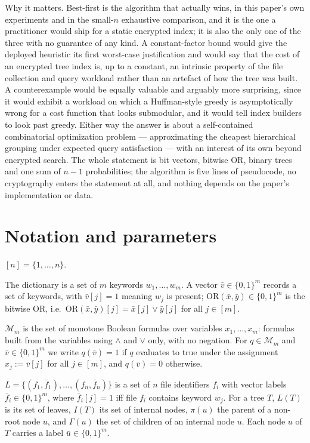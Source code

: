 \documentclass{aicr-conjecture}
\newcommand{\bits}{\{0,1\}}
\newcommand{\Mon}{\mathcal{M}}
\newcommand{\ORv}{\mathrm{OR}}
\begin{document}
Why it matters. Best-first is the algorithm that actually wins, in this
paper's own experiments and in the small-$n$ exhaustive comparison, and
it is the one a practitioner would ship for a static encrypted index; it
is also the only one of the three with no guarantee of any kind. A
constant-factor bound would give the deployed heuristic its first
worst-case justification and would say that the cost of an encrypted tree
index is, up to a constant, an intrinsic property of the file collection
and query workload rather than an artefact of how the tree was built. A
counterexample would be equally valuable and arguably more surprising,
since it would exhibit a workload on which a Huffman-style greedy is
asymptotically wrong for a cost function that looks submodular, and it
would tell index builders to look past greedy. Either way the answer is
about a self-contained combinatorial optimization problem ---
approximating the cheapest hierarchical grouping under expected query
satisfaction --- with an interest of its own beyond encrypted search. The
whole statement is bit vectors, bitwise OR, binary trees and one sum of
$n-1$ probabilities; the algorithm is five lines of pseudocode, no
cryptography enters the statement at all, and nothing depends on the
paper's implementation or data.

\section{Notation and parameters}\label{sec:notation}

$[n] = \{1,\dots,n\}$.

The dictionary is a set of $m$ keywords $w_1,\dots,w_m$. A vector
$\bar v \in \bits^m$ records a set of keywords, with $\bar v[j] = 1$
meaning $w_j$ is present; $\ORv(\bar x,\bar y) \in \bits^m$ is the
bitwise OR, i.e.\ $\ORv(\bar x,\bar y)[j] = \bar x[j] \vee \bar y[j]$ for
all $j \in [m]$.

$\Mon_m$ is the set of monotone Boolean formulas over variables
$x_1,\dots,x_m$: formulas built from the variables using $\wedge$ and
$\vee$ only, with no negation. For $q \in \Mon_m$ and
$\bar v \in \bits^m$ we write $q(\bar v) = 1$ if $q$ evaluates to true
under the assignment $x_j := \bar v[j]$ for all $j \in [m]$, and
$q(\bar v) = 0$ otherwise.

$L = \{(f_1,\bar f_1),\dots,(f_n,\bar f_n)\}$ is a set of $n$ file
identifiers $f_i$ with vector labels $\bar f_i \in \bits^m$, where
$\bar f_i[j] = 1$ iff file $f_i$ contains keyword $w_j$. For a tree $T$,
$L(T)$ is its set of leaves, $I(T)$ its set of internal nodes, $\pi(u)$
the parent of a non-root node $u$, and $\Gamma(u)$ the set of children of
an internal node $u$. Each node $u$ of $T$ carries a label
$\bar u \in \bits^m$.
\end{document}
